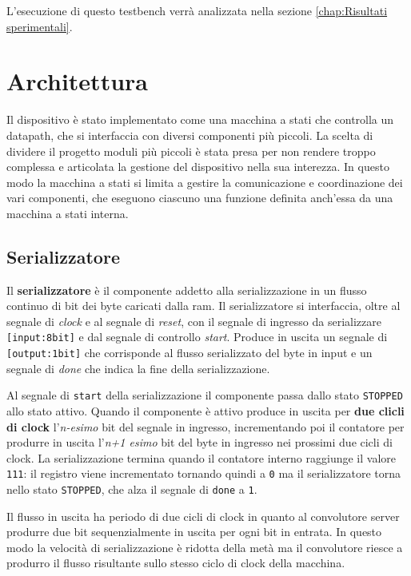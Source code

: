 \documentclass[a4paper]{report}
\begin{document}
L'esecuzione di questo testbench verrà analizzata nella sezione \autoref{chap:Risultati sperimentali}.


\chapter{Architettura}
Il dispositivo è stato implementato come una macchina a stati che controlla un datapath, che si interfaccia con diversi componenti più piccoli. La scelta di dividere il progetto moduli più piccoli è stata presa per non rendere troppo complessa e articolata la gestione del dispositivo nella sua interezza. In questo modo la macchina a stati si limita a gestire la comunicazione e coordinazione dei vari componenti, che eseguono ciascuno una funzione definita anch'essa da una macchina a stati interna.

\section{Serializzatore}

Il \textbf{serializzatore} è il componente addetto alla serializzazione in un flusso continuo di bit dei byte caricati dalla ram.
Il serializzatore si interfaccia, oltre al segnale di \textit{clock} e al segnale di \textit{reset}, con il segnale di ingresso da serializzare \texttt{[input:8bit]} e dal segnale di controllo \textit{start}. Produce in uscita un segnale di \texttt{[output:1bit]} che corrisponde al flusso serializzato del byte in input e un segnale di \textit{done} che indica la fine della serializzazione.

Al segnale di \texttt{start} della serializzazione il componente passa dallo stato \texttt{STOPPED} allo stato attivo. Quando il componente è attivo produce in uscita per \textbf{due clicli di clock} l'\textit{n-esimo} bit del segnale in ingresso, incrementando poi il contatore per produrre in uscita l'\textit{n+1 esimo} bit del byte in ingresso nei prossimi due cicli di clock. La serializzazione termina quando il contatore interno raggiunge il valore \texttt{111}: il registro viene incrementato tornando quindi a \texttt{0} ma il serializzatore torna nello stato \texttt{STOPPED}, che alza il segnale di \texttt{done} a \texttt{1}.

Il flusso in uscita ha periodo di due cicli di clock in quanto al convolutore server produrre due bit sequenzialmente in uscita per ogni bit in entrata. In questo modo la velocità di serializzazione è ridotta della metà ma il convolutore riesce a produrro il flusso risultante sullo stesso ciclo di clock della macchina.
\end{document}

